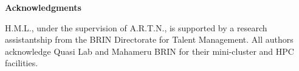 \documentclass[onecolumn, 12pt, sort&compress]{elsarticle}
\begin{document}
\medskip
\noindent\textbf{Acknowledgments}
\medskip

H.M.L., under the supervision of A.R.T.N., is supported by a research assistantship from the BRIN Directorate for Talent Management.  All authors acknowledge Quasi Lab and Mahameru BRIN for their mini-cluster and HPC facilities. 



\end{document}
